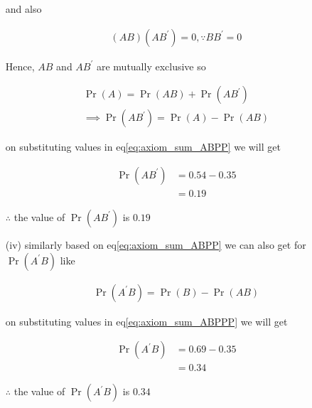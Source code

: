 \documentclass[journal,12pt,twocolumn]{IEEEtran}
\providecommand{\brak}[1]{\ensuremath{\left(#1\right)}}
\providecommand{\pr}[1]{\ensuremath{\Pr\left(#1\right)}}
\begin{document}
\begin{enumerate}
            and also
    
            \begin{align}
                  \brak{ AB}\brak{  AB^{\prime}} = 0, \because BB^{\prime} = 0
                  \label{eq:axiom_sum_ABP}
            \end{align}
                  
            Hence, $AB$ and $AB^{\prime}$ are mutually exclusive so 
    
            \begin{align}
                     \pr{A} = \pr{AB} + \pr{AB^{\prime}} \\
                  \implies 
                     \pr{A B^{\prime}} =  \pr{A} - \pr{AB}
                     \label{eq:axiom_sum_ABPP}
            \end{align}
    
            on substituting values in eq\eqref{eq:axiom_sum_ABPP} we will get
            
            \begin{align}
                     \pr{A B^{\prime}} &= 0.54 - 0.35 \\
                                       &= 0.19
            \end{align}
            
            $\therefore$ the value of $\pr{A B^{\prime}}$ is $0.19$
            
            
            
    \item[(iv)] similarly based on eq\eqref{eq:axiom_sum_ABPP} we can also get for $\pr{A^{\prime} B}$ like 
    
            \begin{align}
                   \pr{A^{\prime} B} =  \pr{B} - \pr{AB}
                   \label{eq:axiom_sum_ABPPP}
            \end{align}
            
            on substituting values in eq\eqref{eq:axiom_sum_ABPPP} we will get

            \begin{align}
                     \pr{A^{\prime} B} &= 0.69 - 0.35 \\
                                       &= 0.34
            \end{align}
            
            $\therefore$ the value of $\pr{A^{\prime} B}$ is $0.34$
            
            
    
\end{enumerate}
\end{document}
